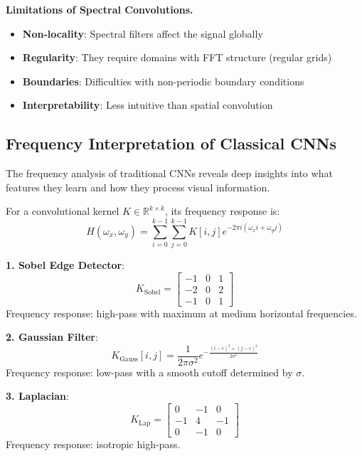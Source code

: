 \textbf{Limitations of Spectral Convolutions.}
\begin{itemize}
    \item \textbf{Non-locality}: Spectral filters affect the signal globally
    \item \textbf{Regularity}: They require domains with \gls{FFT} structure (regular grids)
    \item \textbf{Boundaries}: Difficulties with non-periodic boundary conditions
    \item \textbf{Interpretability}: Less intuitive than spatial convolution
\end{itemize}

\subsection{Frequency Interpretation of Classical CNNs}\label{subsec:interpretacion_frecuencial_cnns}

The frequency analysis of traditional CNNs reveals deep insights into what features they learn and how they process visual information.

\begin{definition}\label{def:respuesta_frecuencial_kernel}
For a convolutional kernel $K \in \mathbb{R}^{k \times k}$, its frequency response is:
\begin{equation}
H(\omega_x, \omega_y) = \sum_{i=0}^{k-1} \sum_{j=0}^{k-1} K[i,j] e^{-2\pi i(\omega_x i + \omega_y j)}
\end{equation}
\end{definition}

\begin{example}\label{ex:analisis_kernels_comunes}
\textbf{1. Sobel Edge Detector}:
\begin{equation}
K_{\text{Sobel}} = \begin{bmatrix} -1 & 0 & 1 \\ -2 & 0 & 2 \\ -1 & 0 & 1 \end{bmatrix}
\end{equation}
Frequency response: high-pass with maximum at medium horizontal frequencies.

\textbf{2. Gaussian Filter}:
\begin{equation}
K_{\text{Gauss}}[i,j] = \frac{1}{2\pi\sigma^2} e^{-\frac{(i-c)^2 + (j-c)^2}{2\sigma^2}}
\end{equation}
Frequency response: low-pass with a smooth cutoff determined by $\sigma$.

\textbf{3. Laplacian}:
\begin{equation}
K_{\text{Lap}} = \begin{bmatrix} 0 & -1 & 0 \\ -1 & 4 & -1 \\ 0 & -1 & 0 \end{bmatrix}
\end{equation}
Frequency response: isotropic high-pass.
\end{example}

